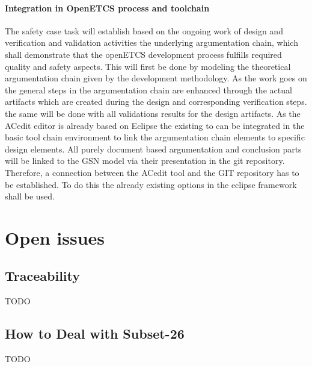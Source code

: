 \paragraph{Integration in OpenETCS process and toolchain}

The safety case task will establish based on the ongoing work of design and verification and validation activities the underlying argumentation chain, which shall demonstrate that the openETCS development process fulfills required quality and safety aspects. This will first be done by modeling the theoretical argumentation chain given by the development methodology. 
As the work goes on the general steps in the argumentation chain are enhanced through the actual artifacts which are created during the design and corresponding verification steps. the same will be done with all validations results for the design artifacts. 
As the ACedit editor is already based on Eclipse the existing to can be integrated in the basic tool chain environment to link the argumentation chain elements to specific design elements. All purely document based argumentation and conclusion parts will be linked to the GSN model via their presentation in the git repository. Therefore, a connection between the ACedit tool and the GIT repository has to be established. To do this the already existing options in the eclipse framework shall be used.

%

\section{Open issues}

\subsection{Traceability}

TODO

\subsection{How to Deal with Subset-26}

TODO

%
%

